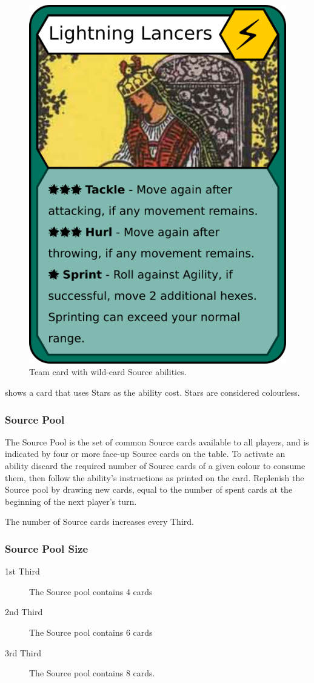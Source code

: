 \begin{figure}
    \centering
    \includegraphics{graphics/yellow-team.png}
    \caption{Team card with wild-card Source abilities.}
    \label{fig:ability-example-2}
\end{figure}

 shows a card that uses Stars as the ability cost.
Stars are considered colourless.
\subsubsection{Source Pool}
The Source Pool is the set of common Source cards available to all players, and is indicated by four or more face-up Source cards on the table.
To activate an ability discard the required number of Source cards of a given colour to consume them, then follow the ability's instructions as printed on the card.
Replenish the Source pool by drawing new cards, equal to the number of spent cards at the beginning of the next player's turn.

The number of Source cards increases every Third.
\subsubsection{Source Pool Size}
\begin{description}
    \item[1st Third] The Source pool contains 4 cards
    \item[2nd Third] The Source pool contains 6 cards
    \item[3rd Third] The Source pool contains 8 cards.
\end{description}